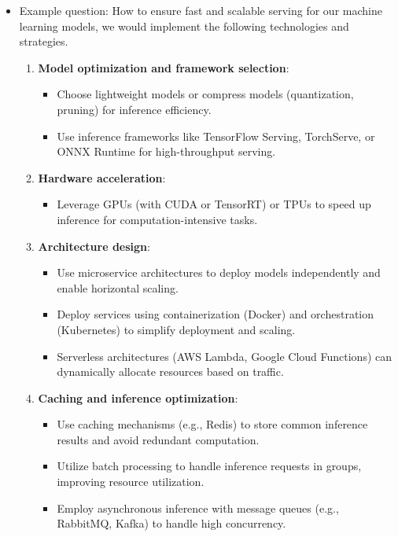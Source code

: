 \documentclass[12pt]{article}
\numberwithin{theorem}{section} %
\numberwithin{definition}{section} %
\numberwithin{assumption}{section} %
\numberwithin{lemma}{section} %
\numberwithin{remark}{section} %
\numberwithin{prop}{section} %
\numberwithin{corollary}{section} %
\numberwithin{example}{section} %
\numberwithin{question}{section} %
\numberwithin{problem}{section} %
\numberwithin{conjecture}{section} %
\numberwithin{append}{section} %
\numberwithin{property}{section} %
\begin{document}
\begin{CJK}{UTF8}{gbsn}
\begin{itemize}
		\item Example question: How to ensure fast and scalable serving for our machine learning models, we would implement the following technologies and strategies.
		
		\begin{enumerate}
			\item \textbf{Model optimization and framework selection}:
			\begin{itemize}
				\item Choose lightweight models or compress models (quantization, pruning) for inference efficiency.
				\item Use inference frameworks like TensorFlow Serving, TorchServe, or ONNX Runtime for high-throughput serving.
			\end{itemize}
			
			\item \textbf{Hardware acceleration}:
			\begin{itemize}
				\item Leverage GPUs (with CUDA or TensorRT) or TPUs to speed up inference for computation-intensive tasks.
			\end{itemize}
			
			\item \textbf{Architecture design}:
			\begin{itemize}
				\item Use microservice architectures to deploy models independently and enable horizontal scaling.
				\item Deploy services using containerization (Docker) and orchestration (Kubernetes) to simplify deployment and scaling.
				\item Serverless architectures (AWS Lambda, Google Cloud Functions) can dynamically allocate resources based on traffic.
			\end{itemize}
			
			\item \textbf{Caching and inference optimization}:
			\begin{itemize}
				\item Use caching mechanisms (e.g., Redis) to store common inference results and avoid redundant computation.
				\item Utilize batch processing to handle inference requests in groups, improving resource utilization.
				\item Employ asynchronous inference with message queues (e.g., RabbitMQ, Kafka) to handle high concurrency.
			\end{itemize}
			

\end{enumerate}
\end{itemize}
\end{CJK}
\end{document}
